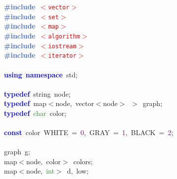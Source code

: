 
{\ttfamily \raggedright {
\noindent
\mbox{}\textbf{\textcolor{RoyalBlue}{\#include}}\ \texttt{\textcolor{Red}{$<$vector$>$}} \\
\mbox{}\textbf{\textcolor{RoyalBlue}{\#include}}\ \texttt{\textcolor{Red}{$<$set$>$}} \\
\mbox{}\textbf{\textcolor{RoyalBlue}{\#include}}\ \texttt{\textcolor{Red}{$<$map$>$}} \\
\mbox{}\textbf{\textcolor{RoyalBlue}{\#include}}\ \texttt{\textcolor{Red}{$<$algorithm$>$}} \\
\mbox{}\textbf{\textcolor{RoyalBlue}{\#include}}\ \texttt{\textcolor{Red}{$<$iostream$>$}} \\
\mbox{}\textbf{\textcolor{RoyalBlue}{\#include}}\ \texttt{\textcolor{Red}{$<$iterator$>$}} \\
\mbox{} \\
\mbox{}\textbf{\textcolor{Blue}{using}}\ \textbf{\textcolor{Blue}{namespace}}\ std\textcolor{BrickRed}{;} \\
\mbox{} \\
\mbox{}\textbf{\textcolor{Blue}{typedef}}\ string\ node\textcolor{BrickRed}{;} \\
\mbox{}\textbf{\textcolor{Blue}{typedef}}\ map\textcolor{BrickRed}{$<$}node\textcolor{BrickRed}{,}\ vector\textcolor{BrickRed}{$<$}node\textcolor{BrickRed}{$>$}\ \textcolor{BrickRed}{$>$}\ graph\textcolor{BrickRed}{;} \\
\mbox{}\textbf{\textcolor{Blue}{typedef}}\ \textcolor{ForestGreen}{char}\ color\textcolor{BrickRed}{;} \\
\mbox{} \\
\mbox{}\textbf{\textcolor{Blue}{const}}\ color\ WHITE\ \textcolor{BrickRed}{=}\ \textcolor{Purple}{0}\textcolor{BrickRed}{,}\ GRAY\ \textcolor{BrickRed}{=}\ \textcolor{Purple}{1}\textcolor{BrickRed}{,}\ BLACK\ \textcolor{BrickRed}{=}\ \textcolor{Purple}{2}\textcolor{BrickRed}{;} \\
\mbox{} \\
\mbox{}graph\ g\textcolor{BrickRed}{;} \\
\mbox{}map\textcolor{BrickRed}{$<$}node\textcolor{BrickRed}{,}\ color\textcolor{BrickRed}{$>$}\ colors\textcolor{BrickRed}{;} \\
\mbox{}map\textcolor{BrickRed}{$<$}node\textcolor{BrickRed}{,}\ \textcolor{ForestGreen}{int}\textcolor{BrickRed}{$>$}\ d\textcolor{BrickRed}{,}\ low\textcolor{BrickRed}{;} \\
}}

